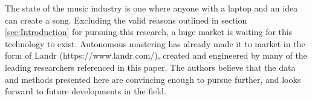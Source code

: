 \documentclass{article}
\begin{document}
The state of the music industry is one where anyone with a laptop and an idea can create a song.  Excluding the valid reasons outlined in section \ref{sec:Introduction} for pursuing this research, a huge market is waiting for this technology to exist.  Autonomous mastering has already made it to market in the form of Landr (https://www.landr.com/), created and engineered by many of the leading researchers referenced in this paper.  The authors believe that the data and methods presented here are convincing enough to pursue further, and looks forward to future developments in the field.


\end{document}
